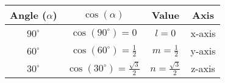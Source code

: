\begin{tabular}{|c|c|c|c|}
\hline
Angle (\(\alpha\)) & \(\cos(\alpha)\) & Value & Axis \\
\hline
\(90^\circ\) & \(\cos(90^\circ) = 0\) & \(l = 0\) & x-axis \\
\(60^\circ\) & \(\cos(60^\circ) = \frac{1}{2}\) & \(m = \frac{1}{2}\) & y-axis \\
\(30^\circ\) & \(\cos(30^\circ) = \frac{\sqrt{3}}{2}\) & \(n = \frac{\sqrt{3}}{2}\) & z-axis \\
\hline
\end{tabular}